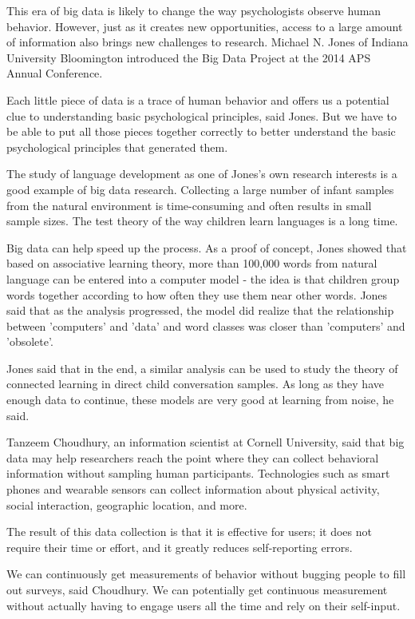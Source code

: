 This era of big data is likely to change the way psychologists observe 
human behavior. However, just as it creates new opportunities, access 
to a large amount of information also brings new challenges to research. 
Michael N. Jones of Indiana University Bloomington introduced the 
Big Data Project at the 2014 APS Annual Conference.

Each little piece of data is a trace of human behavior and offers 
us a potential clue to understanding basic psychological principles, 
said Jones. But we have to be able to put all those pieces together 
correctly to better understand the basic psychological principles 
that generated them\cite{editor01}.

The study of language development as one of Jones's own research interests is a good example of big data research. Collecting a large number of infant samples from the natural environment is time-consuming and often results in small sample sizes. The test theory of the way children learn languages is a long time.

Big data can help speed up the process. As a proof of concept, Jones showed that based on associative learning theory, more than 100,000 words from natural language can be entered into a computer model - the idea is that children group words together according to how often they use them near other words. Jones said that as the analysis progressed, the model did realize that the relationship between 'computers' and 'data' and word classes was closer than 'computers' and 'obsolete'.

Jones said that in the end, a similar analysis can be used to study the theory of connected learning in direct child conversation samples. As long as they have enough data to continue, these models are very good at learning from noise, he said\cite{editor01}.

Tanzeem Choudhury, an information scientist at Cornell University, 
said that big data may help researchers reach the point where they 
can collect behavioral information without sampling human participants. 
Technologies such as smart phones and wearable sensors can collect 
information about physical activity, social interaction, geographic 
location, and more.

The result of this data collection is that it is effective for users; 
it does not require their time or effort, and it greatly reduces 
self-reporting errors.

We can continuously get measurements of behavior without bugging 
people to fill out surveys, said Choudhury. We can potentially get 
continuous measurement without actually having to engage users all 
the time and rely on their self-input\cite{editor01}.

